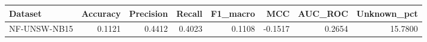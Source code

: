 \begin{tabular}{lrrrrrrr}
\toprule
Dataset & Accuracy & Precision & Recall & F1_macro & MCC & AUC_ROC & Unknown_pct \\
\midrule
NF-UNSW-NB15 & 0.1121 & 0.4412 & 0.4023 & 0.1108 & -0.1517 & 0.2654 & 15.7800 \\
\bottomrule
\end{tabular}
